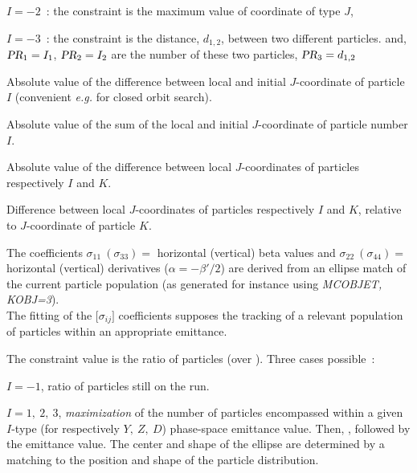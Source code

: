$I=-2$~:  the constraint is the maximum  value of coordinate of type $J$, 

$I=-3$~:  the constraint is the distance, $d_{1,2}$, 
between two different particles.  and,  $\textsl{PR}_1= I_1$, $\textsl{PR}_2=I_2$ are the number  
of these two particles, $\textsl{PR}_3 = d_{1,2}$

\smallskip

 Absolute value of the difference between local and initial $J$-coordinate of particle $I$ (convenient 
\emph{e.g.} for closed orbit search). 

\smallskip

 Absolute value of the sum of the local and initial $J$-coordinate of particle number $I$.


\smallskip

 Absolute value of the difference between local $J$-coordinates of particles respectively 
 $I$ and $K$.

\smallskip

 Difference between local $J$-coordinates of particles respectively 
 $I$ and $K$, relative to $J$-coordinate of particle $K$.

\smallskip

 The coefficients 
$ \sigma_{11}~(\sigma_{ 33}) = $ horizontal (vertical) beta values and 
$ \sigma_{ 22}~(\sigma_{ 44}) = $ horizontal (vertical) derivatives ($\alpha = -\beta'/2$) 
are derived from an ellipse match of the current particle population (as generated for instance using 
\textsl{MCOBJET, KOBJ=3}).\\
%
The fitting of the $ \lbrack \sigma_{ij}\rbrack $ 
coefficients supposes the tracking of a relevant population of particles within an 
appropriate emittance.  

\smallskip

 The constraint value  is the ratio of particles (over \IMAX). Three cases possible~: 

     $I=-1$,  ratio of particles still on the run. 

    $I =1, ~ 2, ~ 3$,   \textsl{maximization} of the number of particles 
 encompassed within a given $I$-type 
(for respectively $Y,~Z,~D$) phase-space emittance value. Then, , followed by the emittance value. 
The center and shape of the ellipse are  
 determined by a  matching to  the position and shape of the particle distribution. 

